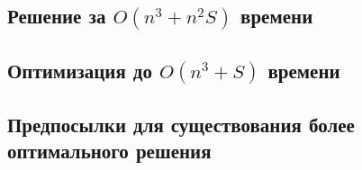\subsection{Решение за $O(n^3 + n^2S)$ времени}





\subsection{Оптимизация до $O(n^3 + S)$ времени}

\subsection{Предпосылки для существования более оптимального решения}